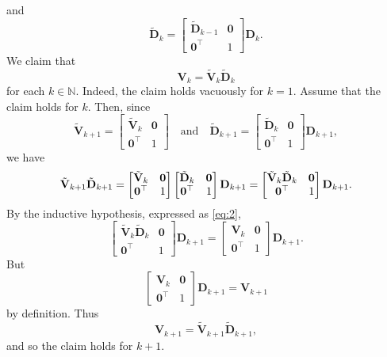 \documentclass[11pt,a4paper]{article}
\newcommand{\0}{\M{0}}
\newcommand{\M}[1]{\mathbf{#1}}
\newcommand{\Mt}[1]{\tilde{\M{#1}}}
\newcommand{\N}{\mathbb{N}}
\newcommand{\T}{\top}
\begin{document}
and
\begin{displaymath}
  \Mt{D}_k
  =
  \begin{bmatrix}
    \Mt{D}_{k-1} & \0
    \\
    \0^\T & 1
  \end{bmatrix}
  \M{D}_k.
\end{displaymath}
We claim that
\begin{equation}
  \label{eq:2}
  \M{V}_k = \Mt{V}_k \Mt{D}_k
\end{equation}
for each $k \in \N$.  Indeed, the claim holds vacuously for $k = 1$. Assume that the claim holds for $k$. Then, since
\begin{displaymath}
   \Mt{V}_{k+1}
  =
  \begin{bmatrix}
    \Mt{V}_k & \0
    \\
    \0^\T & 1
  \end{bmatrix}
  \quad
  \text{and}
  \quad
  \Mt{D}_{k+1}
  =
  \begin{bmatrix}
    \Mt{D}_k & \0
    \\
    \0^\T & 1
  \end{bmatrix}
  \M{D}_{k+1},
\end{displaymath}
we have
\begin{displaymath}
  \Mt{V}_{k+1} \Mt{D}_{k+1}
  =
   \begin{bmatrix}
    \Mt{V}_k & \0
    \\
    \0^\T & 1
  \end{bmatrix}
  \begin{bmatrix}
    \Mt{D}_k & \0
    \\
    \0^\T & 1
  \end{bmatrix}
  \M{D}_{k+1}
  \\
  =
  \begin{bmatrix}
     \Mt{V}_k \Mt{D}_k & \0
    \\
    \0^\T & 1
  \end{bmatrix}
  \M{D}_{k+1}.
\end{displaymath}
By the inductive hypothesis, expressed as \eqref{eq:2}, 
\begin{displaymath}
  \begin{bmatrix}
     \Mt{V}_k \Mt{D}_k & \0
    \\
    \0^\T & 1
  \end{bmatrix}
  \M{D}_{k+1}
  =
  \begin{bmatrix}
     \M{V}_k & \0
    \\
    \0^\T & 1
  \end{bmatrix}
  \M{D}_{k+1}.
\end{displaymath}
But
\begin{displaymath}
  \begin{bmatrix}
     \M{V}_k & \0
    \\
    \0^\T & 1
  \end{bmatrix}
  \M{D}_{k+1}
  =
  \M{V}_{k+1}
\end{displaymath}
by definition.  Thus
\begin{displaymath}
  \M{V}_{k+1} = \Mt{V}_{k+1} \Mt{D}_{k+1},
\end{displaymath}
and so the claim holds for $k+1$.
\end{document}
